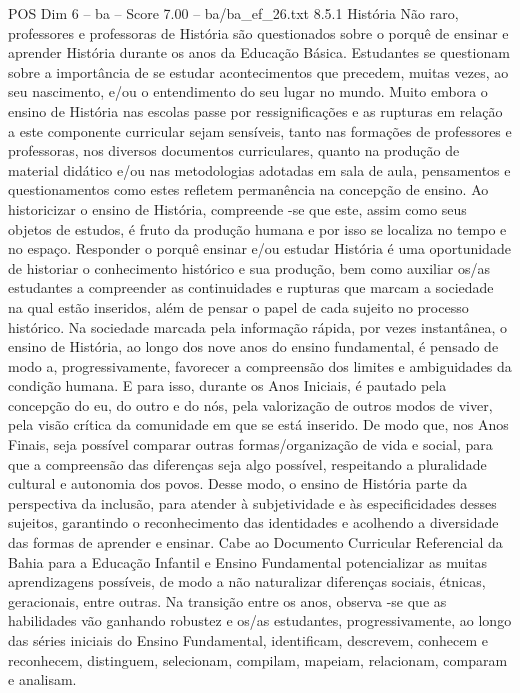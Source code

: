 \begin{textsample}{POS Dim 6 – ba – Score 7.00 – ba/ba\_ef\_26.txt}  \label{ex:f6_pos_079}
8.5.1 História Não raro, professores e professoras de História são questionados sobre o porquê de ensinar e aprender História durante os anos da Educação Básica.
Estudantes se questionam sobre a importância de se estudar acontecimentos que precedem, muitas vezes, ao seu nascimento, e/ou o entendimento do seu lugar no mundo.
Muito embora o ensino de História nas escolas passe por ressignificações e as rupturas em relação a este componente curricular sejam sensíveis, tanto nas formações de professores e professoras, nos diversos documentos curriculares, quanto na produção de material didático e/ou nas metodologias adotadas em sala de aula, pensamentos e questionamentos como estes refletem permanência na concepção de ensino.
Ao historicizar o ensino de História, compreende -se que este, assim como seus objetos de estudos, é fruto da produção humana e por isso se localiza no tempo e no espaço.
Responder o porquê ensinar e/ou estudar História é uma oportunidade de historiar o conhecimento histórico e sua produção, bem como auxiliar os/as estudantes a compreender as continuidades e rupturas que marcam a sociedade na qual estão inseridos, além de pensar o papel de cada sujeito no processo histórico.
Na sociedade marcada pela informação rápida, por vezes instantânea, o ensino de História, ao longo dos nove anos do ensino fundamental, é pensado de modo a, progressivamente, favorecer a compreensão dos limites e ambiguidades da condição humana.
E para isso, durante os Anos Iniciais, é pautado pela concepção do eu, do outro e do nós, pela valorização de outros modos de viver, pela visão crítica da comunidade em que se está inserido.
De modo que, nos Anos Finais, seja possível comparar outras formas/organização de vida e social, para que a compreensão das diferenças seja algo possível, respeitando a pluralidade cultural e autonomia dos povos.
Desse modo, o ensino de História parte da perspectiva da inclusão, para atender à subjetividade e às especificidades desses sujeitos, garantindo o reconhecimento das identidades e acolhendo a diversidade das formas de aprender e ensinar.
Cabe ao Documento Curricular Referencial da Bahia para a Educação Infantil e Ensino Fundamental potencializar as muitas aprendizagens possíveis, de modo a não naturalizar diferenças sociais, étnicas, geracionais, entre outras.
Na transição entre os anos, observa -se que as habilidades vão ganhando robustez e os/as estudantes, progressivamente, ao longo das séries iniciais do Ensino Fundamental, identificam, descrevem, conhecem e reconhecem, distinguem, selecionam, compilam, mapeiam, relacionam, comparam e analisam.

\end{textsample}
